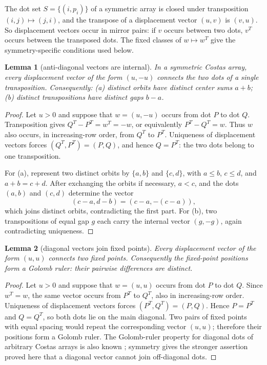 \documentclass[11pt]{article}
\newtheorem{lemma}{Lemma}
\begin{document}
The dot set $S=\{(i,p_i)\}$ of a symmetric array is closed under
transposition $(i,j)\mapsto(j,i)$, and the transpose of a displacement
vector $(u,v)$ is $(v,u)$.  So displacement vectors occur in mirror pairs:
if $v$ occurs between two dots, $v^{T}$ occurs between the transposed
dots.  The fixed classes of $w\mapsto w^{T}$ give the symmetry-specific
conditions used below.

\begin{lemma}[anti-diagonal vectors are internal]
\label{lem:antidiag}
In a symmetric Costas array, every displacement vector of the form
$(u,-u)$ connects the two dots of a single transposition.  Consequently:
(a) distinct orbits have distinct center sums $a+b$; (b) distinct
transpositions have distinct gaps $b-a$.
\end{lemma}

\begin{proof}
Let $u>0$ and suppose that $w=(u,-u)$ occurs from dot $P$ to dot $Q$.
Transposition gives $Q^{T}-P^{T}=w^{T}=-w$, or equivalently
$P^{T}-Q^{T}=w$.  Thus $w$ also occurs, in increasing-row order, from
$Q^{T}$ to $P^{T}$.  Uniqueness of displacement vectors forces
$(Q^{T},P^{T})=(P,Q)$, and hence $Q=P^{T}$: the two dots belong to one
transposition.

For (a), represent two distinct orbits by $\{a,b\}$ and $\{c,d\}$, with
$a\leq b$, $c\leq d$, and $a+b=c+d$.  After exchanging the orbits if
necessary, $a<c$, and the dots $(a,b)$ and $(c,d)$ determine the vector
\[
(c-a,d-b)=(c-a,-(c-a)),
\]
which joins distinct orbits, contradicting the first part.  For (b), two
transpositions of equal gap $g$ each carry the internal vector $(g,-g)$,
again contradicting uniqueness.
\end{proof}

\begin{lemma}[diagonal vectors join fixed points]
\label{lem:diag}
Every displacement vector of the form $(u,u)$ connects two fixed points.
Consequently the fixed-point positions form a Golomb ruler: their pairwise
differences are distinct.
\end{lemma}

\begin{proof}
Let $u>0$ and suppose that $w=(u,u)$ occurs from dot $P$ to dot $Q$.
Since $w^{T}=w$, the same vector occurs from $P^{T}$ to $Q^{T}$, also in
increasing-row order.  Uniqueness of displacement vectors forces
$(P^{T},Q^{T})=(P,Q)$.  Hence $P=P^{T}$ and $Q=Q^{T}$, so both dots lie on
the main diagonal.  Two pairs of fixed points with equal spacing would
repeat the corresponding vector $(u,u)$; therefore their positions form
a Golomb ruler.  The Golomb-ruler property for diagonal dots of arbitrary
Costas arrays is also known
\cite{DrakakisGowOCarroll2006,Drakakis2009GolombRulers,
Drakakis2011OpenProblems}; symmetry gives
the stronger assertion proved here that a diagonal vector cannot join
off-diagonal dots.
\end{proof}
\end{document}
